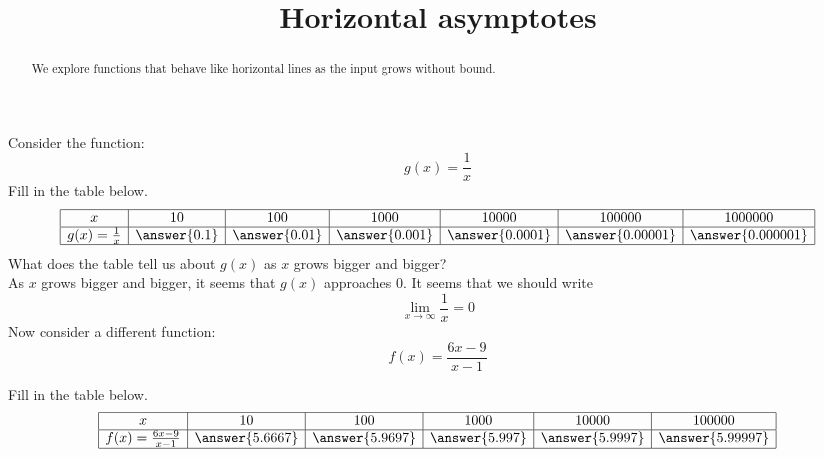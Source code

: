 \documentclass{ximera}
\title[Dig-In:]{Horizontal asymptotes}
\begin{document}
\begin{abstract}
We explore functions that behave like horizontal lines as the input
grows without bound.
\end{abstract}
\maketitle



Consider the function:
\[
g(x) = \frac{1}{x}
\]
Fill in the table below.
  \[
\begin{array}{|c|c|c|c|c|c|c|c|c|}
\hline
x & 10 & 100& 1000&10000 & 100000& 1000000  \\\hline

g(x)=\frac{1}{x} & \answer{0.1} & \answer{0.01} & \answer{0.001} & \answer{0.0001} & \answer{0.00001} & \answer{0.000001} \\\hline
\end{array}
  \]
What does the table tell us about $g(x)$ as $x$ grows bigger and bigger? \\

As $x$ grows bigger and bigger, it seems that $g(x)$ approaches $0$. It seems that we should write
\[
 \lim_{x\to \infty}\frac{1}{x}=0 
\]
 Now consider a different function:
\[
f(x) = \frac{6x-9}{x-1}
\]
\begin{image}
\end{image}
Fill in the table below.
  \[
\begin{array}{|c|c|c|c|c|c|c|c|c|}
\hline
x & 10 & 100& 1000&10000 & 100000 \\\hline

f(x)=\frac{6x-9}{x-1} & \answer{5.6667} & \answer{5.9697} & \answer{5.997} & \answer{5.9997} & \answer{5.99997}  \\\hline
\end{array}
  \]
\end{document}
